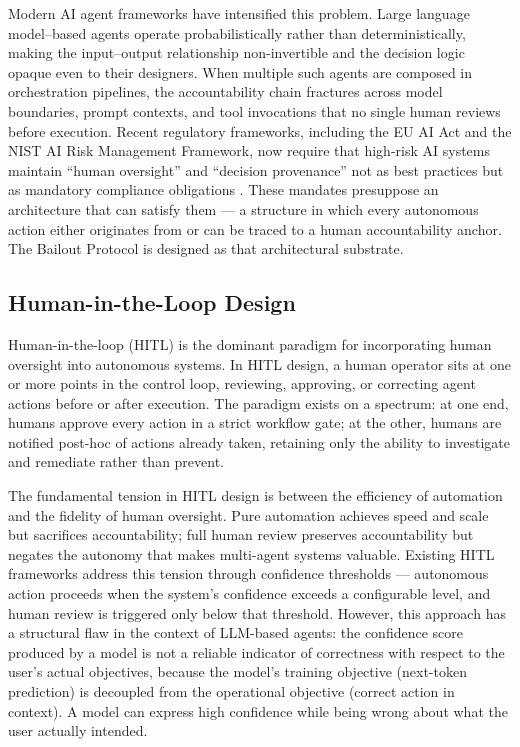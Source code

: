 \documentclass[12pt]{article}
\begin{document}
Modern AI agent frameworks have intensified this problem. Large language model--based agents operate probabilistically rather than deterministically, making the input--output relationship non-invertible and the decision logic opaque even to their designers. When multiple such agents are composed in orchestration pipelines, the accountability chain fractures across model boundaries, prompt contexts, and tool invocations that no single human reviews before execution. Recent regulatory frameworks, including the EU AI Act and the NIST AI Risk Management Framework, now require that high-risk AI systems maintain ``human oversight'' and ``decision provenance'' not as best practices but as mandatory compliance obligations \cite{trist1981}. These mandates presuppose an architecture that can satisfy them --- a structure in which every autonomous action either originates from or can be traced to a human accountability anchor. The Bailout Protocol is designed as that architectural substrate.

\subsection{Human-in-the-Loop Design}

Human-in-the-loop (HITL) is the dominant paradigm for incorporating human oversight into autonomous systems. In HITL design, a human operator sits at one or more points in the control loop, reviewing, approving, or correcting agent actions before or after execution. The paradigm exists on a spectrum: at one end, humans approve every action in a strict workflow gate; at the other, humans are notified post-hoc of actions already taken, retaining only the ability to investigate and remediate rather than prevent.

The fundamental tension in HITL design is between the efficiency of automation and the fidelity of human oversight. Pure automation achieves speed and scale but sacrifices accountability; full human review preserves accountability but negates the autonomy that makes multi-agent systems valuable. Existing HITL frameworks address this tension through confidence thresholds --- autonomous action proceeds when the system's confidence exceeds a configurable level, and human review is triggered only below that threshold. However, this approach has a structural flaw in the context of LLM-based agents: the confidence score produced by a model is not a reliable indicator of correctness with respect to the user's actual objectives, because the model's training objective (next-token prediction) is decoupled from the operational objective (correct action in context). A model can express high confidence while being wrong about what the user actually intended.
\end{document}
